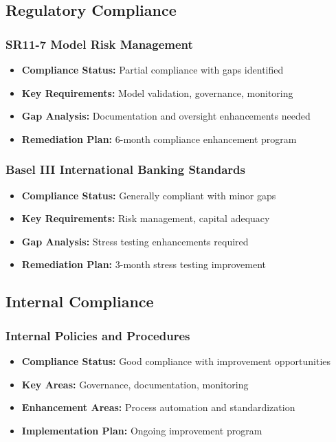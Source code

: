 \documentclass[11pt,a4paper]{article}
\begin{document}
\subsection{Regulatory Compliance}

\subsubsection{SR11-7 Model Risk Management}
\begin{itemize}
\item \textbf{Compliance Status:} Partial compliance with gaps identified
\item \textbf{Key Requirements:} Model validation, governance, monitoring
\item \textbf{Gap Analysis:} Documentation and oversight enhancements needed
\item \textbf{Remediation Plan:} 6-month compliance enhancement program
\end{itemize}

\subsubsection{Basel III International Banking Standards}
\begin{itemize}
\item \textbf{Compliance Status:} Generally compliant with minor gaps
\item \textbf{Key Requirements:} Risk management, capital adequacy
\item \textbf{Gap Analysis:} Stress testing enhancements required
\item \textbf{Remediation Plan:} 3-month stress testing improvement
\end{itemize}

\subsection{Internal Compliance}

\subsubsection{Internal Policies and Procedures}
\begin{itemize}
\item \textbf{Compliance Status:} Good compliance with improvement opportunities
\item \textbf{Key Areas:} Governance, documentation, monitoring
\item \textbf{Enhancement Areas:} Process automation and standardization
\item \textbf{Implementation Plan:} Ongoing improvement program
\end{itemize}
\end{document}

